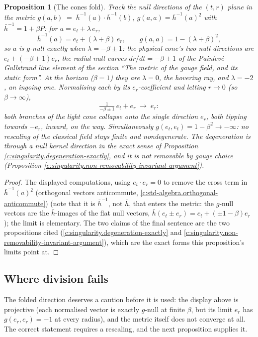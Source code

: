 \documentclass[11pt]{article}
\newtheorem{proposition}[theorem]{Proposition}
\theoremstyle{definition}
\theoremstyle{plain}
\providecommand{\er}{}\renewcommand{\er}{e_r}
\providecommand{\et}{}\renewcommand{\et}{e_t}
\providecommand{\hb}{}\renewcommand{\hb}{\bar{h}}
\begin{document}
\begin{proposition}[The cones fold]\label{c:singularity.cones-fold}
Track the null directions of the $(t,r)$ plane in the metric $g(a,b) \;=\; \hb^{-1}(a) \cdot \hb^{-1}(b)$, $g(a,a) = \hb^{-1}(a)^{2}$ with $\hb^{-1} = 1 + \beta P$: for $a = \et + \lambda\,\er$,
\[
\hb^{-1}(a) = \et + (\lambda + \beta)\,\er, \qquad g(a,a) = 1 - (\lambda + \beta)^2 ,
\]
so $a$ is $g$-null exactly when $\lambda = -\beta \pm 1$: the physical cone's two null directions are $\et + (-\beta \pm 1)\er$, the radial null curves $dr/dt = -\beta \pm 1$ of the Painlev\'e-Gullstrand line element of the section ``The metric of the gauge field, and its static form''. At the horizon ($\beta = 1$) they are $\lambda = 0$, the hovering ray, and $\lambda = -2$, an ingoing one. Normalising each by its $\er$-coefficient and letting $r \to 0$ (so $\beta \to \infty$),
\[
\tfrac{1}{-\beta \pm 1}\,\et + \er \;\longrightarrow\; \er :
\]
both branches of the light cone collapse onto the single direction $\er$, both tipping towards $-\er$, inward, on the way. Simultaneously $g(\et, \et) = 1 - \beta^2 \to -\infty$: no rescaling of the classical field stays finite and nondegenerate. The degeneration is through a null kernel direction in the exact sense of Proposition \ref{c:singularity.degeneration-exactly}, and it is not removable by gauge choice (Proposition \ref{c:singularity.non-removability-invariant-argument}).
\end{proposition}
\begin{proof}
The displayed computations, using $\et \cdot \er = 0$ to remove the cross term in $\hb^{-1}(a)^{2}$ (orthogonal vectors anticommute, \ref{c:std-algebra.orthogonal-anticommute}) (note that it is $\hb^{-1}$, not $\hb$, that enters the metric: the $g$-null vectors are the $\hb$-images of the flat null vectors, $\hb(\et \pm \er) = \et + (\pm 1 - \beta)\er$); the limit is elementary. The two claims of the final sentence are the two propositions cited (\ref{c:singularity.degeneration-exactly} and \ref{c:singularity.non-removability-invariant-argument}), which are the exact forms this proposition's limits point at.

\end{proof}

\subsection*{Where division fails}
\label{c:note.singularity.setting-where-division-fails}
The folded direction deserves a caution before it is used: the display above is projective (each normalised vector is exactly $g$-null at finite $\beta$, but its limit $\er$ has $g(\er, \er) = -1$ at every radius), and the metric itself does not converge at all. The correct statement requires a rescaling, and the next proposition supplies it.
\end{document}
